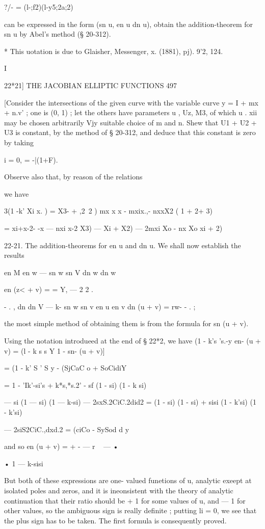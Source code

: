 ?/- = (l-;f2)(l-y5;2a;2)

can be expressed in the form (sn u, en u dn u), obtain the
addition-theorem for sn u by Abel's method (§ 20-312).

* This uotation is due to Glaisher, Messenger, x. (1881), pj). 9'2,
124.

I

22*21] THE JACOBIAN ELLIPTIC FUNCTIONS 497

[Consider the intersections of the given curve with the variable curve
y = I + mx + n.v' ; one is (0, 1) ; let the others have parameters u ,
Uz, M3, of which u . xii may be chosen arbitrarily Vjy suitable choice
of m and n. Shew that U1 + U2 + U3 is constant, by the method of §
20-312, and deduce that this constant is zero by taking

 i = 0, = -|(1+F).

Observe also that, by reason of the relations

we have

 3(1 -k' Xi x. ) = X3- + ,2\ 2 ) mx x x - mxix.,- nxxX2 ( 1 + 2+ 3)

= xi+x-2- -x — nxi x-2 X3) — Xi + X2) — 2mxi Xo - nx Xo xi + 2)

22-21. The addition-theorems for en u and dn u. We shall now establish
the results

en M en w — sn w sn V dn w dn w

en (z< + v) = = Y, — 2 2 .

- . , dn dn V — k- sn w sn v en u en v dn (u + v) = rw- - . ;

the most simple method of obtaining them is from the formula for sn (u
+ v).

Using the notation introdueed at the end of § 22*2, we have (1 - k's
's.-y en- (u + v) = (l - k s s Y 1 - sn- (u + v)]

= (1 - k' S ' S y - (SjCaC o + SoCidiY

= 1 - 'Ik'-si's + k*s,*s.2' - sf (1 - si) (1 - k si)

— si (1 — si) (1 — k-si) — 2sxS.2CiC.2did2 = (1 - si) (1 - si) + sisi
(1 - k'si) (1 - k'si)

— 2siS2CiC.,dxd.2 = (ciCo - SySod d y

and so en (u + v) = + - — r ~ — •

• 1 — k-sisi

But both of these expressions are one- valued funetions of u, analytic
exeept at isolated poles and zeros, and it is ineonsistent with the
theory of analytic continuation that their ratio should be + 1 for
some values of u, and — 1 for other values, so the ambiguous sign is
really definite ; putting li = 0, we see that the plus sign has to be
taken. The first formula is consequently proved.

